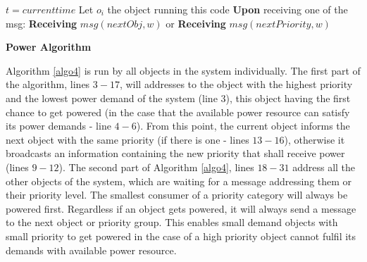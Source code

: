 \documentclass[letterpaper, 10 pt, conference]{ieeeconf}
\begin{document}
\LinesNumbered
\IncMargin{1em}
\begin{algorithm}
$t = current time$
\BlankLine
Let $o_{i}$ the object running this code
\BlankLine
{}
\textbf{Upon} receiving one of the msg:\newline
\textbf{Receiving} $msg(nextObj, w)$ or\newline
\textbf{Receiving} $msg(nextPriority, w)$\newline
{}
\caption{\textbf{Power Algorithm}} \label{algo4}
\end{algorithm}
\DecMargin{1em}

Algorithm \ref{algo4} is run by all objects in the system individually. The first part of the algorithm, lines $3-17$, will addresses to the object with the highest priority and the lowest power demand of the system (line $3$), this object having the first chance to get powered (in the case that the available power resource can satisfy its power demands - line $4-6$). From this point, the current object informs the next object with the same priority (if there is one - lines $13-16$), otherwise it broadcasts an information containing the new priority that shall receive power (lines $9-12$). The second part of Algorithm \ref{algo4}, lines $18-31$ address all the other objects of the system, which are waiting for a message addressing them or their priority level. The smallest consumer of a priority category will always be powered first. Regardless if an object gets powered, it will always send a message to the next object or priority group. This enables small demand objects with small priority to get powered in the case of a high priority object cannot fulfil its demands with available power resource.
\end{document}
